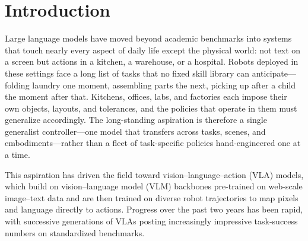 \section{Introduction}
\label{sec:intro}


Large language models have moved beyond academic benchmarks into systems that touch nearly every aspect of daily life except the physical world: not text on a screen but actions in a kitchen, a warehouse, or a hospital. Robots deployed in these settings face a long list of tasks that no fixed skill library can anticipate—folding laundry one moment, assembling parts the next, picking up after a child the moment after that. Kitchens, offices, labs, and factories each impose their own objects, layouts, and tolerances, and the policies that operate in them must generalize accordingly. The long-standing aspiration is therefore a single generalist controller—one model that transfers across tasks, scenes, and embodiments—rather than a fleet of task-specific policies hand-engineered one at a time.

This aspiration has driven the field toward vision–language–action (VLA) models, which build on vision–language model (VLM) backbones pre-trained on web-scale image–text data and are then trained on diverse robot trajectories to map pixels and language directly to actions. Progress over the past two years has been rapid, with successive generations of VLAs posting increasingly impressive task-success numbers on standardized benchmarks.

